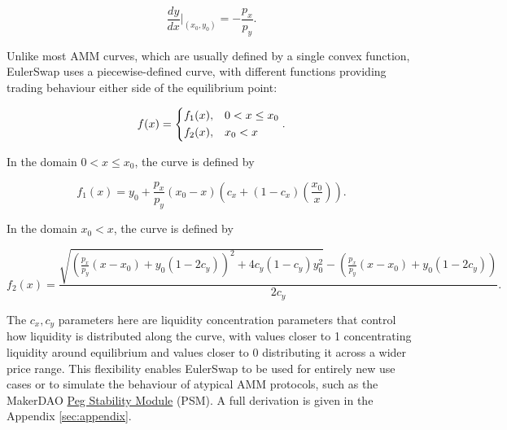 \documentclass{article}
\begin{document}
\begin{equation}
\frac{dy}{dx} \Big|_{(x_0, y_0)} = -\frac{p_x}{p_y}.
\end{equation}

Unlike most AMM curves, which are usually defined by a single convex function, EulerSwap uses a piecewise-defined curve, with different functions providing trading behaviour either side of the equilibrium point:

\begin{equation}
    \label{eq:fx-main}
    f(x) =
    \begin{dcases}
        f_1(x), 
        & 0 < x \leq x_0 \\
        f_2(x), 
        & x_0 < x
    \end{dcases}.
\end{equation}

In the domain $0 < x \leq x_0$, the curve is defined by

\begin{equation}
    \label{eq:fx1-main}
    f_1(x) 
    =
    y_{0}+\frac{p_{x}}{p_{y}}\left(x_{0}-x\right)\left(c_{x}+\left(1-c_{x}\right)\left(\frac{x_{0}}{x}\right)\right).
\end{equation}

In the domain $x_0 < x$, the curve is defined by

\begin{equation}
    \label{eq:fx2-main}
    f_2(x) 
    =
    \frac{
        \sqrt{
            \left( \frac{p_x}{p_y} (x - x_0) + y_0 (1 - 2c_y) \right)^2 
            + 4c_y (1 - c_y) y_0^2
        } 
        - \left( \frac{p_x}{p_y} (x - x_0) + y_0 (1 - 2c_y) \right)
    }{2c_y}.
\end{equation}

 The $c_x, c_y$ parameters here are liquidity concentration parameters that control how liquidity is distributed along the curve, with values closer to 1 concentrating liquidity around equilibrium and values closer to 0 distributing it across a wider price range. This flexibility enables EulerSwap to be used for entirely new use cases or to simulate the behaviour of atypical AMM protocols, such as the MakerDAO \href{https://mips.makerdao.com/mips/details/MIP29}{Peg Stability Module} (PSM). A full derivation is given in the Appendix \ref{sec:appendix}.  
 
\end{document}

